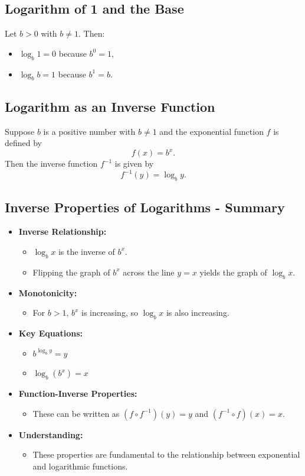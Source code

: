 \subsection{Logarithm of 1 and the Base}
Let \(b>0\) with \(b\neq 1\). Then:
\begin{itemize}
  \item \(\log_b 1 = 0\) because \(b^0 = 1\),
  \item \(\log_b b = 1\) because \(b^1 = b\).
\end{itemize}

\subsection{Logarithm as an Inverse Function}
Suppose \(b\) is a positive number with \(b \neq 1\) and the exponential function \(f\) is defined by
\[ f(x) = b^x. \]
Then the inverse function \(f^{-1}\) is given by
\[ f^{-1}(y) = \log_b y. \]

\subsection{Inverse Properties of Logarithms - Summary}
\begin{itemize}
  \item \textbf{Inverse Relationship:}
    \begin{itemize}
      \item \(\log_b x\) is the inverse of \(b^x\).
      \item Flipping the graph of \(b^x\) across the line \(y=x\) yields the graph of \(\log_b x\).
    \end{itemize}
  \item \textbf{Monotonicity:}
    \begin{itemize}
      \item For \(b>1\), \(b^x\) is increasing, so \(\log_b x\) is also increasing.
    \end{itemize}
  \item \textbf{Key Equations:}
    \begin{itemize}
      \item \(b^{\log_b y} = y\)
      \item \(\log_b (b^x) = x\)
    \end{itemize}
  \item \textbf{Function-Inverse Properties:}
    \begin{itemize}
      \item These can be written as \((f \circ f^{-1})(y) = y\) and \((f^{-1} \circ f)(x) = x\).
    \end{itemize}
  \item \textbf{Understanding:}
    \begin{itemize}
      \item These properties are fundamental to the relationship between exponential and logarithmic functions.
    \end{itemize}
\end{itemize}


